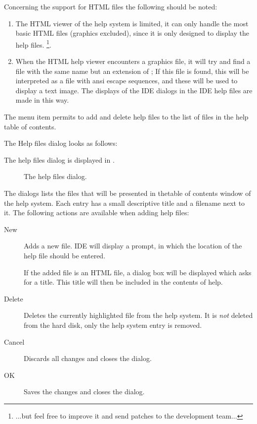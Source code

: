 \begin{remark}
Concerning the support for HTML files the following should be noted:
\begin{enumerate}
\item
The HTML viewer of the  help system is limited, it can only handle the 
most basic HTML files (graphics excluded), since it is only designed 
to display the \fpc help files. \footnote{...but feel free to improve it and send patches to the 
\fpc development team...}.
\item
When the HTML help viewer encounters a graphics file, it will try and find a
file with the same name but an extension of ; If this file is
found, this will be interpreted as a file with ansi escape sequences, and 
these will be used to display a text image. The displays of the IDE dialogs
in the IDE help files are made in this way.
\end{enumerate}
\end{remark}

The menu item  permits to add and delete help files to the
list of files in the help table of contents.
\begin{htmlonly}
The Help files dialog looks as follows:
\end{htmlonly}
\begin{latexonly}
The help files dialog is displayed in .
\begin{figure}[ht]
\begin{center}
\caption{The help files dialog.}\label{fig:helpfiles}
\ifpdf
{}
\else
{}
\fi
\end{center}
\end{figure}
\end{latexonly}
The dialogs lists the files that will be presented in thetable of contents
window of the help system. Each entry has a small descriptive title and a
filename next to it. The following actions are available when adding help
files:
\begin{description}
\item[New] Adds a new file. IDE will display a prompt, in which the 
location of the help file should be entered. 

If the added file is an HTML file, a dialog box will be displayed
which asks for a title. This title will then be included in the
contents of help.
\item[Delete] Deletes the currently highlighted file from the help system.
It is \emph{not} deleted from the hard disk, only the help system entry is
removed.
\item[Cancel] Discards all changes and closes the dialog.
\item[OK] Saves the changes and closes the dialog.
\end{description}

